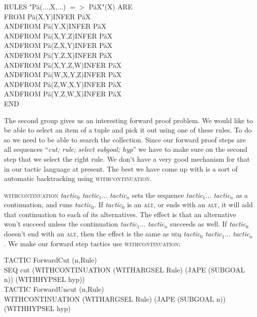 RULES "P\"{a}(...,X,...) $=>$ P\"{a}X"(X) ARE \\
\tab FROM P\"{a}(X,Y)\tab INFER P\"{a}X \\
AND\tab FROM P\"{a}(Y,X)\tab INFER P\"{a}X \\
AND\tab FROM P\"{a}(X,Y,Z)\tab INFER P\"{a}X \\
AND\tab FROM P\"{a}(Z,X,Y)\tab INFER P\"{a}X \\
AND\tab FROM P\"{a}(Y,Z,X)\tab INFER P\"{a}X \\
AND\tab FROM P\"{a}(X,Y,Z,W)\tab INFER P\"{a}X \\
AND\tab FROM P\"{a}(W,X,Y,Z)\tab INFER P\"{a}X \\
AND\tab FROM P\"{a}(Z,W,X,Y)\tab INFER P\"{a}X \\
AND\tab FROM P\"{a}(Y,Z,W,X)\tab INFER P\"{a}X\\
END


The second group gives us an interesting forward proof problem. We would like to be able to select an item of a tuple and pick it out using one of these rules. To do so we need to be able to search the collection. Since our forward proof steps are all sequences ``\textit{cut; rule; select subgoal; hyp}'' we have to make sure on the second step that we select the right rule. We don't have a very good mechanism for that in our tactic language at present. The best we have come up with is a sort of automatic backtracking using \textsc{withcontinuation}.


\textsc{withcontinuation} \textit{tactic}$_{0}$ \textit{tactic}$_{1}$... \textit{tactic}$_{\textit{n}}$ sets the sequence \textit{tactic}$_{1}$... \textit{tactic}$_{\textit{n}}$ as a continuation, and runs \textit{tactic}$_{0}$. If \textit{tactic}$_{0}$ is an \textsc{alt}, or ends with an \textsc{alt}, it will add that continuation to each of its alternatives. The effect is that an alternative won't succeed unless the continuation \textit{tactic}$_{1}$... \textit{tactic}$_{\textit{n}}$ succeeds as well. If \textit{tactic}$_{0}$ doesn't end with an \textsc{alt}, then the effect is the same as \textsc{seq} \textit{tactic}$_{0}$ \textit{tactic}$_{1}$... \textit{tactic}$_{\textit{n}}$. We make our forward step tactics use \textsc{withcontinuation}:

TACTIC ForwardCut (n,Rule)\\
\tab SEQ cut (WITHCONTINUATION (WITHARGSEL Rule) (JAPE (SUBGOAL n)) (WITHHYPSEL hyp))\\
TACTIC ForwardUncut (n,Rule)\\
\tab WITHCONTINUATION (WITHARGSEL Rule) (JAPE (SUBGOAL n)) (WITHHYPSEL hyp)


